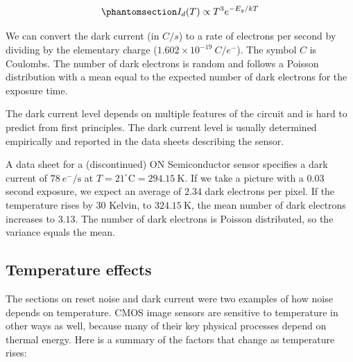 \documentclass[
  letterpaper,
]{book}
\begin{document}
\begin{equation}\phantomsection\label{eq-sensor-darkcurrent}{
I_d(T) \propto T^3 e^{-E_g/kT}
}\end{equation}

We can convert the dark current (in \(C/s\)) to a rate of electrons per
second by dividing by the elementary charge
(\(1.602 \times 10^{-19}~C/e^-\)). The symbol \(C\) is Coulombs. The
number of dark electrons is random and follows a Poisson distribution
with a mean equal to the expected number of dark electrons for the
exposure time.

The dark current level depends on multiple features of the circuit and
is hard to predict from first principles. The dark current level is
usually determined empirically and reported in the data sheets
describing the sensor.

\begin{tcolorbox}[enhanced jigsaw, opacityback=0, breakable, coltitle=black, leftrule=.75mm, left=2mm, colframe=quarto-callout-note-color-frame, opacitybacktitle=0.6, bottomtitle=1mm, bottomrule=.15mm, toprule=.15mm, title=\textcolor{quarto-callout-note-color}{\faInfo}\hspace{0.5em}{Dark current units}, titlerule=0mm, toptitle=1mm, colback=white, rightrule=.15mm, colbacktitle=quarto-callout-note-color!10!white, arc=.35mm]

A data sheet for a (discontinued) ON Semiconductor sensor specifies a
dark current of \(78~e^{-}/\text{s}\) at
\(T = 21^\circ\text{C} = 294.15~\text{K}\). If we take a picture with a
0.03 second exposure, we expect an average of \(2.34\) dark electrons
per pixel. If the temperature rises by \(30\) Kelvin, to
\(324.15~\text{K}\), the mean number of dark electrons increases to
\(3.13\). The number of dark electrons is Poisson distributed, so the
variance equals the mean.

\end{tcolorbox}

\subsection{Temperature effects}\label{sec-temperature-effects}

The sections on reset noise and dark current were two examples of how
noise depends on temperature. CMOS image sensors are sensitive to
temperature in other ways as well, because many of their key physical
processes depend on thermal energy. Here is a summary of the factors
that change as temperature rises:
\end{document}
